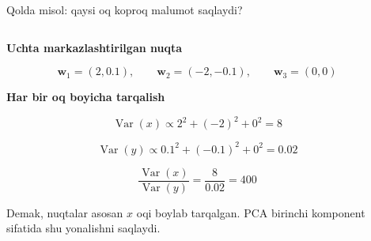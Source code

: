 \documentclass[aspectratio=169,11pt]{beamer}
\begin{document}
\begin{frame}{Qo\textquotesingle{}lda misol: qaysi o\textquotesingle{}q ko\textquotesingle{}proq ma\textquotesingle{}lumot saqlaydi?}
\scriptsize

\begin{columns}[T,totalwidth=\textwidth]
\begin{column}{0.50\textwidth}

\textbf{Uchta markazlashtirilgan nuqta}

\[
\mathbf{w}_1=(2,0.1),\qquad
\mathbf{w}_2=(-2,-0.1),\qquad
\mathbf{w}_3=(0,0)
\]

\vspace{2pt}

\textbf{Har bir o\textquotesingle{}q bo\textquotesingle{}yicha tarqalish}

\[
\operatorname{Var}(x)\propto 2^2+(-2)^2+0^2=8
\]

\[
\operatorname{Var}(y)\propto 0.1^2+(-0.1)^2+0^2=0.02
\]

\[
\frac{\operatorname{Var}(x)}{\operatorname{Var}(y)}
=
\frac{8}{0.02}
=
400
\]

\vspace{2pt}

\begin{tcolorbox}[defbox,left=2mm,right=2mm,top=1mm,bottom=1mm]
\footnotesize
Demak, nuqtalar asosan $x$ o\textquotesingle{}qi bo\textquotesingle{}ylab
tarqalgan. PCA birinchi komponent sifatida shu yo\textquotesingle{}nalishni
saqlaydi.
\end{tcolorbox}

\end{column}

\begin{column}{0.46\textwidth}
\centering

\end{column}
\end{columns}
\end{frame}
\end{document}
